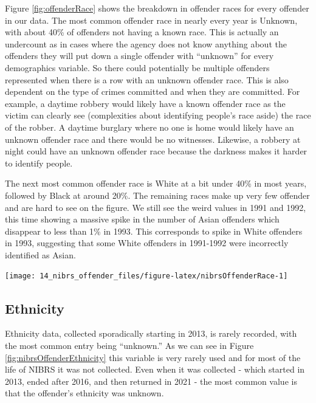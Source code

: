 \documentclass[
]{krantz}
\let\origfigure\figure
\let\endorigfigure\endfigure
\renewenvironment{figure}[1][2] {
    \expandafter\origfigure\expandafter[H]
} {
    \endorigfigure
}
\begin{document}
Figure \ref{fig:offenderRace} shows the breakdown in
offender races for every offender in our data. The most
common offender race in nearly every year is Unknown, with
about 40\% of offenders not having a known race. This is
actually an undercount as in cases where the agency does not
know anything about the offenders they will put down a
single offender with ``unknown'' for every demographics
variable. So there could potentially be multiple offenders
represented when there is a row with an unknown offender
race. This is also dependent on the type of crimes committed
and when they are committed. For example, a daytime robbery
would likely have a known offender race as the victim can
clearly see (complexities about identifying people's race
aside) the race of the robber. A daytime burglary where no
one is home would likely have an unknown offender race and
there would be no witnesses. Likewise, a robbery at night
could have an unknown offender race because the darkness
makes it harder to identify people.

The next most common offender race is White at a bit under
40\% in most years, followed by Black at around 20\%. The
remaining races make up very few offender and are hard to
see on the figure. We still see the weird values in 1991 and
1992, this time showing a massive spike in the number of
Asian offenders which disappear to less than 1\% in 1993.
This corresponds to spike in White offenders in 1993,
suggesting that some White offenders in 1991-1992 were
incorrectly identified as Asian.

\begin{figure}

{\centering \texttt{[image: 14\_nibrs\_offender\_files/figure-latex/nibrsOffenderRace-1]} 

}

\caption{The share of offenders by race, 1991-2022.}\label{fig:nibrsOffenderRace}
\end{figure}

\subsection{Ethnicity}\label{ethnicity-2}

Ethnicity data, collected sporadically starting in 2013, is
rarely recorded, with the most common entry being
``unknown.'' As we can see in Figure
\ref{fig:nibrsOffenderEthnicity} this variable is very
rarely used and for most of the life of NIBRS it was not
collected. Even when it was collected - which started in
2013, ended after 2016, and then returned in 2021 - the most
common value is that the offender's ethnicity was unknown.
\end{document}
